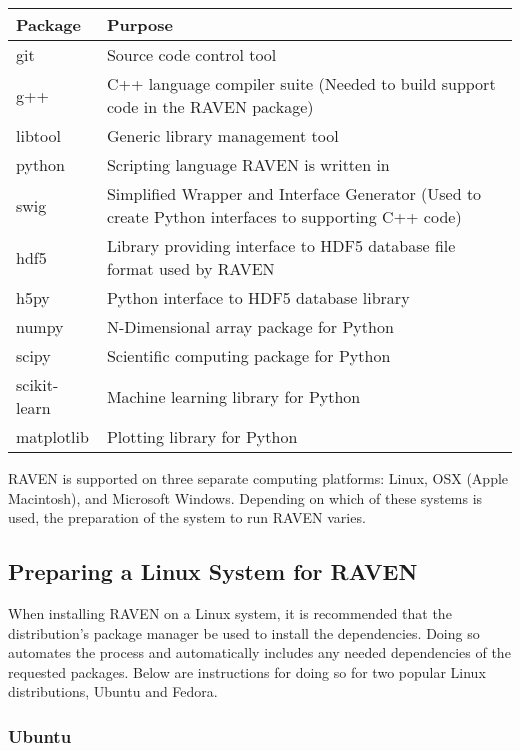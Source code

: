 \begin{center}
    \begin{tabular}{ | l | p{10cm} |}
    \hline Package & Purpose \\
    \hline git & Source code control tool \\
    \hline g++ & C++ language compiler suite (Needed to build
        support code in the RAVEN package) \\
    \hline libtool & Generic library management tool \\
    \hline python & Scripting language RAVEN is written in \\
    \hline swig & Simplified Wrapper and Interface Generator
        (Used to create Python interfaces to supporting C++ code) \\
    \hline hdf5 & Library providing interface to HDF5 database
        file format used by RAVEN \\
    \hline h5py & Python interface to HDF5 database library \\
    \hline numpy & N-Dimensional array package for Python \\
    \hline scipy &  Scientific computing package for Python \\
    \hline scikit-learn & Machine learning library for Python \\
    \hline matplotlib & Plotting library for Python \\
    \hline
    \end{tabular}
\end{center}


RAVEN is supported on three separate computing platforms:
Linux, OSX (Apple Macintosh), and Microsoft Windows.  Depending
on which of these systems is used, the preparation of the system
to run RAVEN varies.

\subsection{Preparing a Linux System for RAVEN}
\label{sysprep_linux}

When installing RAVEN on a Linux system, it is recommended that the
distribution's package manager be used to install the dependencies.
Doing so automates the process and automatically includes any needed
dependencies of the requested packages.  Below are instructions for
doing so for two popular Linux distributions, Ubuntu and Fedora.

\subsubsection{Ubuntu}


